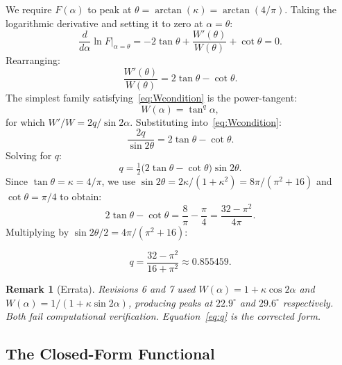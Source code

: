 \documentclass[11pt,a4paper]{article}
\newcommand{\kap}{\kappa}
\newtheorem{remark}{Remark}
\begin{document}
We require $F(\alpha)$ to peak at $\theta=\arctan(\kap)=\arctan(4/\pi)$. Taking the logarithmic derivative and setting it to zero at $\alpha=\theta$:
\begin{equation}\label{eq:stationarity}
  \frac{d}{d\alpha}\ln F\Big|_{\alpha=\theta}
  = -2\tan\theta + \frac{W'(\theta)}{W(\theta)} + \cot\theta = 0.
\end{equation}
Rearranging:
\begin{equation}\label{eq:Wcondition}
  \frac{W'(\theta)}{W(\theta)} = 2\tan\theta - \cot\theta.
\end{equation}
The simplest family satisfying~\eqref{eq:Wcondition} is the power-tangent:
\begin{equation}\label{eq:W}
  W(\alpha)=\tan^q\!\alpha,
\end{equation}
for which $W'/W = 2q/\sin 2\alpha$. Substituting into~\eqref{eq:Wcondition}:
\begin{equation}
  \frac{2q}{\sin 2\theta} = 2\tan\theta-\cot\theta.
\end{equation}
Solving for $q$:
\begin{equation}\label{eq:qgeneral}
  q = \tfrac{1}{2}\bigl(2\tan\theta - \cot\theta\bigr)\sin 2\theta.
\end{equation}
Since $\tan\theta=\kap=4/\pi$, we use $\sin 2\theta = 2\kap/(1+\kap^2) = 8\pi/(\pi^2+16)$ and $\cot\theta=\pi/4$ to obtain:
\begin{equation}
  2\tan\theta-\cot\theta = \frac{8}{\pi}-\frac{\pi}{4} = \frac{32-\pi^2}{4\pi}.
\end{equation}
Multiplying by $\sin 2\theta/2 = 4\pi/(\pi^2+16)$:

\begin{equation}\label{eq:q}\boxed{
  q = \frac{32-\pi^2}{16+\pi^2} \approx 0.855459.
}\end{equation}

\begin{remark}[Errata]
Revisions 6 and 7 used $W(\alpha)=1+\kap\cos 2\alpha$ and $W(\alpha)=1/(1+\kap\sin 2\alpha)$, producing peaks at $22.9^\circ$ and $29.6^\circ$ respectively. Both fail computational verification. Equation~\eqref{eq:q} is the corrected form.
\end{remark}

\subsection{The Closed-Form Functional}
\end{document}

